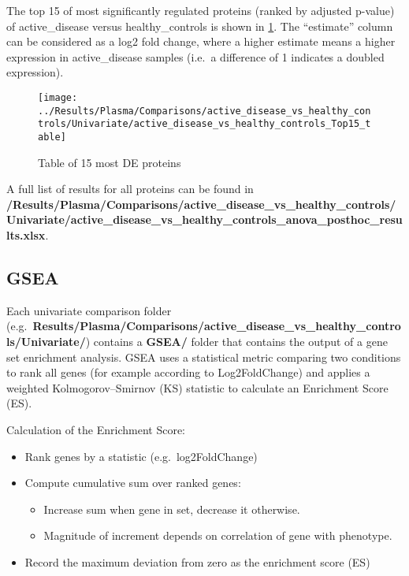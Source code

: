 \documentclass[
]{book}
\providecommand{\tightlist}{%
  \setlength{\itemsep}{0pt}\setlength{\parskip}{0pt}}
\begin{document}
The top 15 of most significantly regulated proteins (ranked by adjusted p-value) of active\_disease versus healthy\_controls is shown in \ref{fig:top15}. The ``estimate'' column can be considered as a log2 fold change, where a higher estimate means a higher expression in active\_disease samples (i.e.~a difference of 1 indicates a doubled expression).

\begin{figure}

{\centering \texttt{[image: ../Results/Plasma/Comparisons/active\_disease\_vs\_healthy\_controls/Univariate/active\_disease\_vs\_healthy\_controls\_Top15\_table]} 

}

\caption{Table of 15 most DE proteins}\label{fig:top15}
\end{figure}

A full list of results for all proteins can be found in \textbf{/Results/Plasma/Comparisons/active\_disease\_vs\_healthy\_controls/Univariate/active\_disease\_vs\_healthy\_controls\_anova\_posthoc\_results.xlsx}.

\hypertarget{gsea}{%
\subsection{GSEA}\label{gsea}}

Each univariate comparison folder (e.g.~\textbf{Results/Plasma/Comparisons/active\_disease\_vs\_healthy\_controls/Univariate/}) contains a \textbf{GSEA/} folder that contains the output of a gene set enrichment analysis. GSEA uses a statistical metric comparing two conditions to rank all genes (for example according to Log2FoldChange) and applies a weighted Kolmogorov--Smirnov (KS) statistic to calculate an Enrichment Score (ES).

Calculation of the Enrichment Score:

\begin{itemize}
\tightlist
\item
  Rank genes by a statistic (e.g.~log2FoldChange)
\item
  Compute cumulative sum over ranked genes:

  \begin{itemize}
  \tightlist
  \item
    Increase sum when gene in set, decrease it otherwise.
  \item
    Magnitude of increment depends on correlation of gene
    with phenotype.
  \end{itemize}
\item
  Record the maximum deviation from zero as the enrichment score (ES)
\end{itemize}
\end{document}
